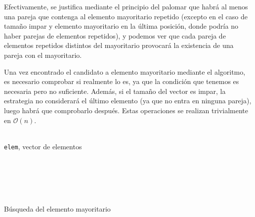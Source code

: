 \documentclass[a4paper, 11pt]{article} %
\begin{document}
Efectivamente, se justifica mediante el principio del palomar que habrá al menos una pareja que contenga al elemento mayoritario repetido (excepto en el caso de tamaño impar y elemento mayoritario en la última posición, donde podría no haber parejas de elementos repetidos), y podemos ver que cada pareja de elementos repetidos distintos del mayoritario provocará la existencia de una pareja con el mayoritario.

Una vez encontrado el candidato a elemento mayoritario mediante el algoritmo, es necesario comprobar si realmente lo es, ya que la condición que tenemos es necesaria pero no suficiente. Además, si el tamaño del vector es impar, la estrategia no considerará el último elemento (ya que no entra en ninguna pareja), luego habrá que comprobarlo después. Estas operaciones se realizan trivialmente en $\mathcal{O}(n)$.

\begin{algorithm}[H]
	\begin{algorithmic}[1]
		\REQUIRE \ \\
        	\texttt{elem}, vector de elementos\\\
    	 		\RETURN{\texttt{elem[0]}} 
     		\ELSE
     		\ENDIF \\\
     		
	     		\IF{\texttt{p} == \texttt{q}}
	     		\ENDIF
     		\ENDFOR
    	\ENDIF \\\
     		\RETURN{\texttt{may}}
     	\ELSE
     		\ELSE
     		\ENDIF
    	\ENDIF
	\end{algorithmic}
    \caption{Búsqueda del elemento mayoritario}
    \label{mayoritario}
\end{algorithm}
\end{document}
